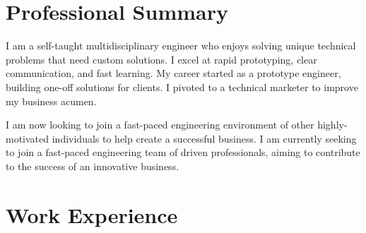 \documentclass[
	10pt, %
]{FreemanCV}
\begin{document}
\vspace{-35pt}

\section {Professional Summary}
I am a self-taught multidisciplinary engineer who enjoys solving unique technical problems that need custom solutions.
I excel at rapid prototyping, clear communication, and fast learning.
My career started as a prototype engineer, building one-off solutions for clients.
I pivoted to a technical marketer to improve my business acumen.

I am now looking to join a fast-paced engineering environment of other highly-motivated individuals to help create a successful business.
I am currently seeking to join a fast-paced engineering team of driven professionals, aiming to contribute to the success of an innovative business.

\section{Work Experience}




\end{document}
